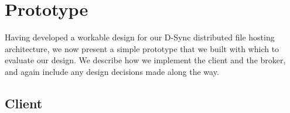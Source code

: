 \section{Prototype}
\label{prototype}
Having developed a workable design for our D-Sync distributed
file hosting architecture,
we now present a simple prototype that we built with which to
evaluate our design.
We describe how we implement the client and the broker,
and again include any design decisions made along the way.

\subsection{Client}
